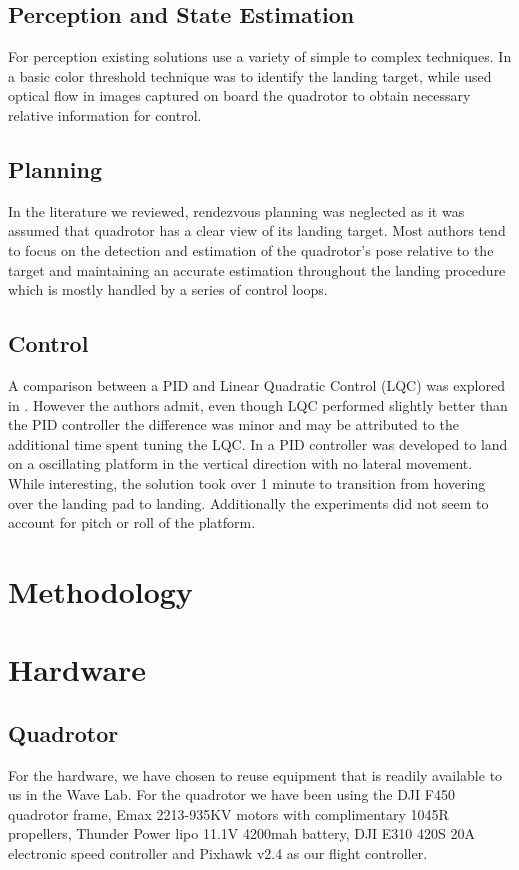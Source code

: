 \documentclass[11pt, twocolumn]{article}
\begin{document}
\subsection{Perception and State Estimation}
For perception existing solutions use a variety of simple to complex techniques. In \cite{Kim2014} a basic color threshold technique was to identify the landing target, while \cite{Herisse2012} used optical flow in images captured on board the quadrotor to obtain necessary relative information for control. 

\subsection{Planning}
In the literature we reviewed, rendezvous planning was neglected as it was assumed that quadrotor has a clear view of its landing target. Most authors tend to focus on the detection and estimation of the quadrotor's pose relative to the target and maintaining an accurate estimation throughout the landing procedure which is mostly handled by a series of control loops.

\subsection{Control}
A comparison between a PID and Linear Quadratic Control (LQC) was explored in \cite{Friis2009}. However the authors admit, even though LQC performed slightly better than the PID controller the difference was minor and may be attributed to the additional time spent tuning the LQC. In \cite{Herisse2012} a PID controller was developed to land on a oscillating platform in the vertical direction with no lateral movement. While interesting, the solution took over 1 minute to transition from hovering over the landing pad to landing. Additionally the experiments did not seem to account for pitch or roll of the platform.  

\section{Methodology}

\section{Hardware}
\subsection{Quadrotor}
For the hardware, we have chosen to reuse equipment that is readily available to us in the Wave Lab. For the quadrotor we have been using the DJI F450 quadrotor frame, Emax 2213-935KV motors with complimentary 1045R propellers, Thunder Power lipo 11.1V 4200mah battery, DJI E310 420S 20A electronic speed controller and Pixhawk v2.4 as our flight controller.
\end{document}
